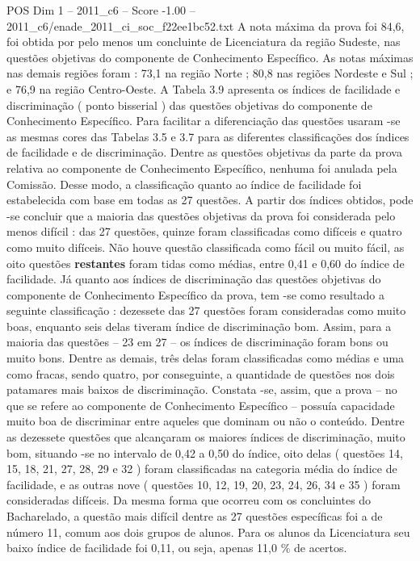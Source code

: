 \begin{textsample}{POS Dim 1 – 2011\_c6 – Score -1.00 – 2011\_c6/enade\_2011\_ci\_soc\_f22ee1bc52.txt}
A nota máxima da prova foi 84,6, foi obtida por pelo menos um concluinte de Licenciatura da região Sudeste, nas questões objetivas do componente de Conhecimento Específico.
As notas máximas nas demais regiões foram : 73,1 na região Norte ; 80,8 nas regiões Nordeste e Sul ; e 76,9 na região Centro-Oeste.
A Tabela 3.9 apresenta os índices de facilidade e discriminação ( ponto bisserial ) das questões objetivas do componente de Conhecimento Específico.
Para facilitar a diferenciação das questões usaram -se as mesmas cores das Tabelas 3.5 e 3.7 para as diferentes classificações dos índices de facilidade e de discriminação.
Dentre as questões objetivas da parte da prova relativa ao componente de Conhecimento Específico, nenhuma foi anulada pela Comissão.
Desse modo, a classificação quanto ao índice de facilidade foi estabelecida com base em todas as 27 questões.
A partir dos índices obtidos, pode -se concluir que a maioria das questões objetivas da prova foi considerada pelo menos difícil : das 27 questões, quinze foram classificadas como difíceis e quatro como muito difíceis.
Não houve questão classificada como fácil ou muito fácil, as oito questões \textbf{restantes} foram tidas como médias, entre 0,41 e 0,60 do índice de facilidade.
Já quanto aos índices de discriminação das questões objetivas do componente de Conhecimento Específico da prova, tem -se como resultado a seguinte classificação : dezessete das 27 questões foram consideradas como muito boas, enquanto seis delas tiveram índice de discriminação bom.
Assim, para a maioria das questões – 23 em 27 – os índices de discriminação foram bons ou muito bons.
Dentre as demais, três delas foram classificadas como médias e uma como fracas, sendo quatro, por conseguinte, a quantidade de questões nos dois patamares mais baixos de discriminação.
Constata -se, assim, que a prova – no que se refere ao componente de Conhecimento Específico – possuía capacidade muito boa de discriminar entre aqueles que dominam ou não o conteúdo.
Dentre as dezessete questões que alcançaram os maiores índices de discriminação, muito bom, situando -se no intervalo de 0,42 a 0,50 do índice, oito delas ( questões 14, 15, 18, 21, 27, 28, 29 e 32 ) foram classificadas na categoria média do índice de facilidade, e as outras nove ( questões 10, 12, 19, 20, 23, 24, 26, 34 e 35 ) foram consideradas difíceis.
Da mesma forma que ocorreu com os concluintes do Bacharelado, a questão mais difícil dentre as 27 questões específicas foi a de número 11, comum aos dois grupos de alunos.
Para os alunos da Licenciatura seu baixo índice de facilidade foi 0,11, ou seja, apenas 11,0 \% de acertos.

\end{textsample}

